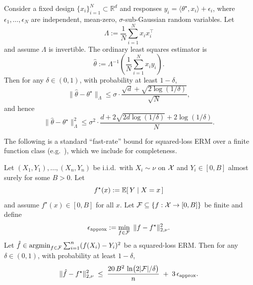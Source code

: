 \begin{theorem}\label{thm:ols_fixed_design}
Consider a fixed design $\{x_i\}_{i=1}^N\subset\mathbb{R}^d$ and responses
$y_i = \langle \theta^\star, x_i\rangle + \epsilon_i$, where
$\epsilon_1,\dots,\epsilon_N$ are independent, mean-zero, $\sigma$-sub-Gaussian
random variables. Let
\[
\Lambda := \frac{1}{N}\sum_{i=1}^N x_ix_i^\top
\]
and assume $\Lambda$ is invertible. The ordinary least squares estimator is
\[
\hat\theta := \Lambda^{-1}\left(\frac{1}{N}\sum_{i=1}^N x_i y_i\right).
\]
Then for any $\delta\in(0,1)$, with probability at least $1-\delta$,
\[
\|\hat\theta-\theta^\star\|_{\Lambda}
\le
\sigma \cdot \frac{\sqrt{d}+\sqrt{2\log(1/\delta)}}{\sqrt{N}},
\]
and hence
\[
\|\hat\theta-\theta^\star\|_{\Lambda}^2
\le
\sigma^2 \cdot \frac{d + 2\sqrt{2d\log(1/\delta)} + 2\log(1/\delta)}{N}.
\]
\end{theorem}

The following is a standard ``fast-rate'' bound for squared-loss ERM over a
finite function class (e.g.\ \cite{Gyrfi2002ADT}), which we include for
completeness.

\begin{lemma}
\label{lem:least_square_gen}
Let $(X_1,Y_1),\dots,(X_n,Y_n)$ be i.i.d.\ with $X_i\sim \nu$ on $\mathcal{X}$ and
$Y_i\in[0,B]$ almost surely for some $B>0$. Let
\[
f^\star(x) := \mathbb{E}[\,Y \mid X=x\,]
\]
and assume $f^\star(x)\in[0,B]$ for all $x$. Let $\mathcal{F}\subseteq\{f:\mathcal{X}\to[0,B]\}$
be finite and define
\[
\epsilon_{\mathrm{approx}}
:= \min_{f\in\mathcal{F}}\ \|f-f^\star\|_{2,\nu}^2.
\]
Let $\hat f\in\operatorname*{argmin}_{f\in\mathcal{F}}\sum_{i=1}^n (f(X_i)-Y_i)^2$ be a squared-loss ERM.
Then for any $\delta\in(0,1)$, with probability at least $1-\delta$,
\[
\|\hat f - f^\star\|_{2,\nu}^2
\;\le\;
\frac{20\,B^2\,\ln\!\big(2|\mathcal{F}|/\delta\big)}{n}
\;+\;
3\,\epsilon_{\mathrm{approx}}.
\]
\end{lemma}


